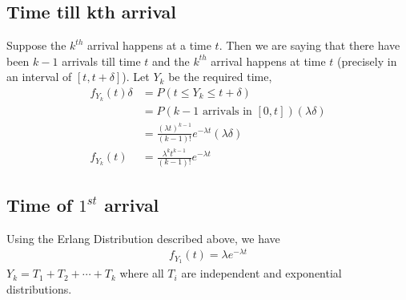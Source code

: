 \documentclass[11pt, a4paper]{article}
\begin{document}
    \subsection{Time till kth arrival}
    Suppose the $k^{th}$ arrival happens at a time $t$. Then we are saying that there have been $k-1$ arrivals till time $t$ and the $k^{th}$ arrival happens at time $t$ (precisely in an interval of $[t, t+\delta]$). Let $Y_{k}$ be the required time,
    \begin{align*}
        f_{Y_{k}}(t)\delta &= P(t \leq Y_{k} \leq t+\delta)\\
                    &= P(\text{$k-1$ arrivals  in $[0,t]$}) (\lambda \delta)\\
                    &= \frac{(\lambda t)^{k-1}}{(k-1)!}e^{-\lambda t}(\lambda \delta)\\
        f_{Y_{k}}(t) &= \frac{\lambda^{k} t^{k-1}}{(k-1)!}e^{-\lambda t} \tag*{Erland Distribution}
    \end{align*}

    \subsection{Time of $1^{st}$ arrival}
    Using the Erlang Distribution described above, we have
    \begin{align*}
        f_{Y_{1}}(t) = \lambda e^{-\lambda t}
    \end{align*}
    $Y_{k} = T_{1} + T_{2} + \cdots + T_{k}$ where all $T_{i}$ are independent and exponential distributions.
\end{document}
